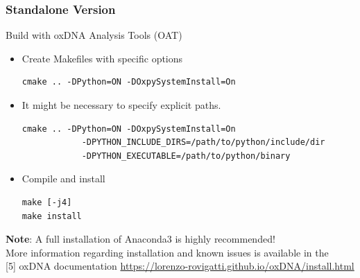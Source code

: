 \documentclass[slidestop,compress,9pt]{beamer}
\begin{document}
\begin{frame}[fragile]
\frametitle{Standalone Version}

Build with oxDNA Analysis Tools (OAT)\\[7pt]

\begin{itemize}
\item Create Makefiles with specific options
\begin{lstlisting}
cmake .. -DPython=ON -DOxpySystemInstall=On
\end{lstlisting}
\item It might be necessary to specify explicit paths.
\begin{lstlisting}
cmake .. -DPython=ON -DOxpySystemInstall=On 
            -DPYTHON_INCLUDE_DIRS=/path/to/python/include/dir
            -DPYTHON_EXECUTABLE=/path/to/python/binary
\end{lstlisting}
\item Compile and install
\begin{lstlisting}
make [-j4]
make install
\end{lstlisting}
\end{itemize}

\textbf{Note}: A full installation of Anaconda3 is highly recommended!\\[7pt]

More information regarding installation and known issues is available in the\\[3pt] 
[5] oxDNA documentation \href{https://lorenzo-rovigatti.github.io/oxDNA/install.html}{https://lorenzo-rovigatti.github.io/oxDNA/install.html}

\end{frame}
\end{document}
